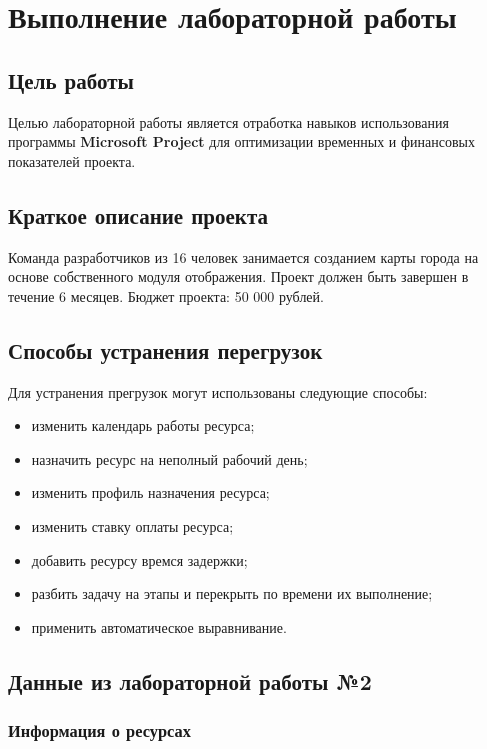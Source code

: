 \chapter{Выполнение лабораторной работы}


\section{Цель работы}

Целью лабораторной работы является отработка навыков использования программы \textbf{Microsoft Project} для оптимизации временных и финансовых показателей проекта.


\section{Краткое описание проекта}

Команда разработчиков из 16 человек занимается созданием карты города на основе собственного модуля отображения. Проект должен быть завершен в течение 6 месяцев. Бюджет проекта: 50 000 рублей.


\section{Способы устранения перегрузок}

Для устранения прегрузок могут использованы следующие способы:

\begin{itemize}
    \item изменить календарь работы ресурса;
    \item назначить ресурс на неполный рабочий день;
    \item изменить профиль назначения ресурса;
    \item изменить ставку оплаты ресурса;
    \item добавить ресурсу времся задержки;
    \item разбить задачу на этапы и перекрыть по времени их выполнение;
    \item применить автоматическое выравнивание.
\end{itemize}


\section{Данные из лабораторной работы №2}

\subsection{Информация о ресурсах}

